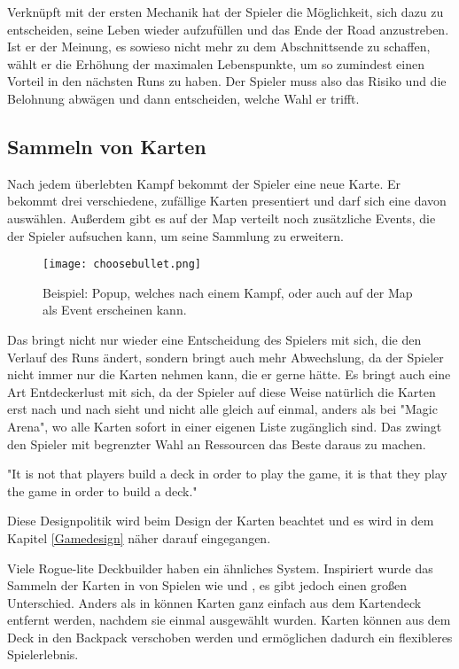 Verknüpft mit der ersten Mechanik
hat der Spieler die Möglichkeit, sich dazu zu entscheiden, seine Leben wieder aufzufüllen und das Ende der Road anzustreben.
Ist er der Meinung, es sowieso nicht mehr zu dem Abschnittsende zu schaffen, wählt er die Erhöhung der maximalen
Lebenspunkte, um so zumindest einen Vorteil in den nächsten Runs zu haben. Der Spieler muss also das Risiko und die
Belohnung abwägen und dann entscheiden, welche Wahl er trifft.



\subsection{Sammeln von Karten}\label{sammeln_der_Karten}

Nach jedem überlebten Kampf bekommt der Spieler eine neue Karte. Er bekommt drei verschiedene, zufällige Karten presentiert und darf sich eine davon auswählen.
Außerdem gibt es auf der Map verteilt noch zusätzliche Events, die der Spieler aufsuchen kann, um seine Sammlung zu erweitern.

\begin{figure}[H]
    \texttt{[image: choosebullet.png]}
    \caption{Beispiel: Popup, welches nach einem Kampf, oder auch auf der Map als Event erscheinen kann.}
\end{figure}

Das bringt nicht nur wieder eine Entscheidung des Spielers mit sich, die den Verlauf des Runs ändert, sondern bringt auch mehr Abwechslung,
da der Spieler nicht immer nur die Karten nehmen kann, die er gerne hätte. Es bringt auch eine Art Entdeckerlust mit sich, da der Spieler
auf diese Weise natürlich die Karten erst nach und nach sieht und nicht alle gleich auf einmal, anders als bei \zB "Magic Arena",
wo alle Karten sofort in einer eigenen Liste zugänglich sind.  Das zwingt den Spieler mit begrenzter Wahl an Ressourcen das Beste daraus zu machen.

"It is not that players build a deck in order to play the game, it is that they play the game in order to build a deck."%


Diese Designpolitik wird beim Design der Karten beachtet und es wird in dem Kapitel \ref{Gamedesign} näher darauf eingegangen.


Viele Rogue-lite Deckbuilder haben ein ähnliches System. Inspiriert wurde das Sammeln der Karten in \FF von Spielen wie  und ,
es gibt jedoch einen großen Unterschied. Anders als in \zB {} können Karten ganz einfach aus dem Kartendeck entfernt werden, nachdem sie einmal ausgewählt wurden.
Karten können aus dem Deck in den Backpack verschoben werden und ermöglichen dadurch ein flexibleres Spielerlebnis.


